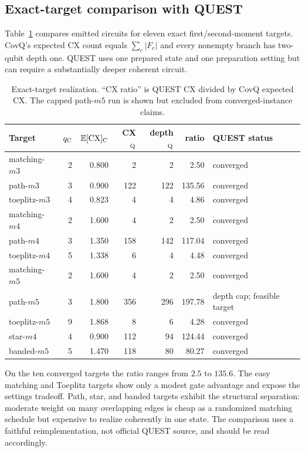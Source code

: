 \documentclass[11pt]{article}
\theoremstyle{definition}
\theoremstyle{remark}
\begin{document}
\subsection{Exact-target comparison with QUEST}
\label{sec:results-quest-exact}
Table~\ref{tab:quest-exact} compares emitted circuits for eleven exact first/second-moment targets. CovQ's expected CX count equals $\sum_e|F_e|$ and every nonempty branch has two-qubit depth one. QUEST uses one prepared state and one preparation setting but can require a substantially deeper coherent circuit.

\begin{table}[H]
\centering
\caption{Exact-target realization. ``CX ratio'' is QUEST CX divided by CovQ expected CX. The capped path-$m5$ run is shown but excluded from converged-instance claims.}
\label{tab:quest-exact}
\begin{tabularx}{\textwidth}{lrrrrrX}
\toprule
Target & $q_{\rm C}$ & $\mathbb E[\mathrm{CX}]_{\rm C}$ & CX$_{\rm Q}$ & depth$_{\rm Q}$ & ratio & QUEST status\\
\midrule
matching-$m3$ & 2 & 0.800 & 2 & 2 & 2.50 & converged\\
path-$m3$ & 3 & 0.900 & 122 & 122 & 135.56 & converged\\
toeplitz-$m3$ & 4 & 0.823 & 4 & 4 & 4.86 & converged\\
matching-$m4$ & 2 & 1.600 & 4 & 2 & 2.50 & converged\\
path-$m4$ & 3 & 1.350 & 158 & 142 & 117.04 & converged\\
toeplitz-$m4$ & 5 & 1.338 & 6 & 4 & 4.48 & converged\\
matching-$m5$ & 2 & 1.600 & 4 & 2 & 2.50 & converged\\
path-$m5$ & 3 & 1.800 & 356 & 296 & 197.78 & depth cap; feasible target\\
toeplitz-$m5$ & 9 & 1.868 & 8 & 6 & 4.28 & converged\\
star-$m4$ & 4 & 0.900 & 112 & 94 & 124.44 & converged\\
banded-$m5$ & 5 & 1.470 & 118 & 80 & 80.27 & converged\\
\bottomrule
\end{tabularx}
\end{table}

On the ten converged targets the ratio ranges from $2.5$ to $135.6$. The easy matching and Toeplitz targets show only a modest gate advantage and expose the settings tradeoff. Path, star, and banded targets exhibit the structural separation: moderate weight on many overlapping edges is cheap as a randomized matching schedule but expensive to realize coherently in one state. The comparison uses a faithful reimplementation, not official QUEST source, and should be read accordingly.
\end{document}
